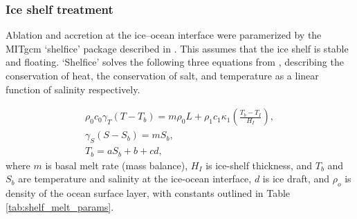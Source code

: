 
\subsubsection{Ice shelf treatment} \label{sec:ice_shelf_mb}

Ablation and accretion at the ice--ocean interface were paramerized by the MITgcm `shelfice' package described in \citep{losch2008modeling}. This assumes that the ice shelf is stable and floating. `Shelfice' solves the following three equations from \cite{hellmer1989two}, describing the conservation of heat, the conservation of salt, and temperature as a linear function of salinity respectively.

\begin{align}
    \rho_0 c_0 \gamma_T ( T - T_b) = m \rho_0 L + \rho_1 c_1 \kappa_1 \left( \frac{T_b - T_I}{H_I} \right), \label{eq:melt}\\
    \gamma_S \left( S- S_b \right) = m S_b, \\
    T_b = a S_b + b + c d,
\end{align}
where $m$ is basal melt rate (mass balance), $H_I$ is ice-shelf thickness, and $T_b$ and $S_b$ are temperature and salinity at the ice-ocean interface, $d$ is ice draft, and $\rho_o$ is density of the ocean surface layer, with constants outlined in Table \ref{tab:shelf_melt_params}. 
 
